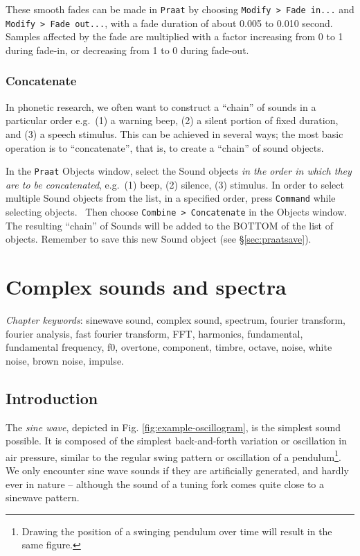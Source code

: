 \documentclass[
]{book}
\begin{document}
\label{box-praatfades}
These smooth fades can be made in \texttt{Praat} by choosing \texttt{Modify\ \textgreater{}\ Fade\ in...} and \texttt{Modify\ \textgreater{}\ Fade\ out...}, with a fade duration of about 0.005 to 0.010 second. Samples affected by the fade are multiplied with a factor increasing from 0 to 1 during fade-in, or decreasing from 1 to 0 during fade-out.

\subsection{Concatenate}\label{sec:concatenate}

In phonetic research, we often want to construct a ``chain'' of sounds in a particular order e.g.~(1) a warning beep, (2) a silent portion of fixed duration, and (3) a speech stimulus. This can be achieved in several ways; the most basic operation is to ``concatenate'', that is, to create a ``chain'' of sound objects.

\label{box-praatconcatenate}
In the \texttt{Praat} Objects window, select the Sound objects \emph{in the order in which they are to be concatenated}, e.g.~(1) beep, (2) silence, (3) stimulus. In order to select multiple Sound objects from the list, in a specified order, press \texttt{Command} while selecting objects.~
Then choose \texttt{Combine\ \textgreater{}\ Concatenate} in the Objects window. The resulting ``chain'' of Sounds will be added to the BOTTOM of the list of objects. Remember to save this new Sound object (see §\ref{sec:praatsave}).

\chapter{Complex sounds and spectra}\label{complex-sounds-and-spectra}

\emph{Chapter keywords}: sinewave sound, complex sound, spectrum, fourier transform, fourier analysis, fast fourier transform, FFT, harmonics, fundamental, fundamental frequency, f0, overtone, component, timbre, octave, noise, white noise, brown noise, impulse.

\section{Introduction}\label{sec:FTintro}

The \emph{sine wave}, depicted in Fig. \ref{fig:example-oscillogram}, is the simplest sound possible. It is composed of the simplest back-and-forth variation or oscillation in air pressure, similar to the regular swing pattern or oscillation of a pendulum\footnote{Drawing the position of a swinging pendulum over time will result in the same figure.}. We only encounter sine wave sounds if they are artificially generated, and hardly ever in nature -- although the sound of a tuning fork comes quite close to a sinewave pattern.
\end{document}
